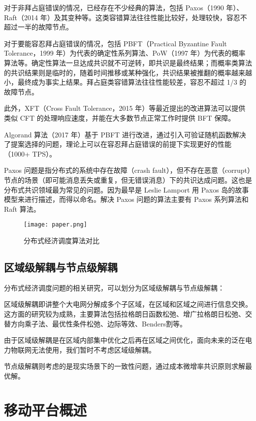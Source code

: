 对于非拜占庭错误的情况，已经存在不少经典的算法，包括 Paxos（1990 年）、Raft（2014 年）及其变种等。这类容错算法往往性能比较好，处理较快，容忍不超过一半的故障节点。

对于要能容忍拜占庭错误的情况，包括 PBFT（Practical Byzantine Fault Tolerance，1999 年）为代表的确定性系列算法、PoW（1997 年）为代表的概率算法等。确定性算法一旦达成共识就不可逆转，即共识是最终结果；而概率类算法的共识结果则是临时的，随着时间推移或某种强化，共识结果被推翻的概率越来越小，最终成为事实上结果。拜占庭类容错算法往往性能较差，容忍不超过 1/3 的故障节点。

此外，XFT（Cross Fault Tolerance，2015 年）等最近提出的改进算法可以提供类似 CFT 的处理响应速度，并能在大多数节点正常工作时提供 BFT 保障。

Algorand 算法（2017 年）基于 PBFT 进行改进，通过引入可验证随机函数解决了提案选择的问题，理论上可以在容忍拜占庭错误的前提下实现更好的性能（1000+ TPS）。

Paxos 问题是指分布式的系统中存在故障（crash fault），但不存在恶意（corrupt）节点的场景（即可能消息丢失或重复，但无错误消息）下的共识达成问题。这也是分布式共识领域最为常见的问题。因为最早是 Leslie Lamport 用 Paxos 岛的故事模型来进行描述，而得以命名。解决 Paxos 问题的算法主要有 Paxos 系列算法和 Raft 算法。

\begin{figure}[htbp] %
    \centering
    \texttt{[image: paper.png]}
    \caption{分布式经济调度算法对比}
    \label{fig:CompareAlgorithm}
\end{figure}

\subsection{区域级解耦与节点级解耦}

分布式经济调度问题的相关研究，可以划分为区域级解耦与节点级解耦：

区域级解耦即讲整个大电网分解成多个子区域，在区域和区域之间进行信息交换。这方面的研究较为成熟，主要算法包括拉格朗日函数松弛、增广拉格朗日松弛、交替方向乘子法、最优性条件松弛、边际等效、Benders割等。

由于区域级解耦是在区域内部集中优化之后再在区域之间优化，面向未来的泛在电力物联网无法使用，我们暂时不考虑区域级解耦。

节点级解耦则考虑的是现实场景下的一致性问题，通过成本微增率共识原则求解最优解。

\section{移动平台概述}

